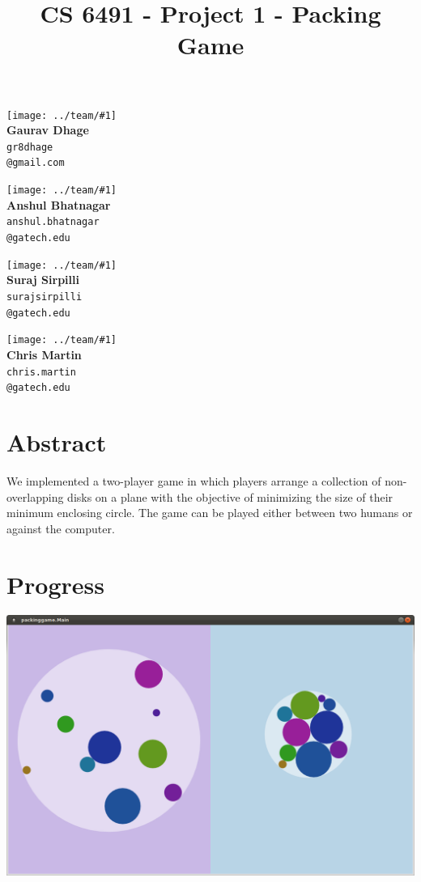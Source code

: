 \documentclass[10pt,twocolumn]{article}
\title{
\vspace{-60pt}
CS 6491 - Project 1 - Packing Game
\vspace{-20pt}
}
\date{}
\begin{document}
\maketitle

  \newcommand\photo[3]{
    \parbox[r]{0.4\linewidth}{
      \centering
      \texttt{[image: ../team/\#1]}
      \\\textbf{#2}\\\texttt{\small#3}
    }
  }
  \photo{gaurav}{Gaurav Dhage}{gr8dhage\\@gmail.com}
  \photo{anshul}{Anshul Bhatnagar}{anshul.bhatnagar\\@gatech.edu}

  \photo{suraj}{Suraj Sirpilli}{surajsirpilli\\@gatech.edu}
  \photo{chris}{Chris Martin}{chris.martin\\@gatech.edu}

\section{Abstract}

We implemented a two-player game in which players arrange a collection
of non-overlapping disks on a plane with the objective of minimizing
the size of their minimum enclosing circle.
The game can be played either between two humans or against the computer.

\section{Progress}

{\centering

\includegraphics[scale=0.2]{screenshot.png}

}
\end{document}
